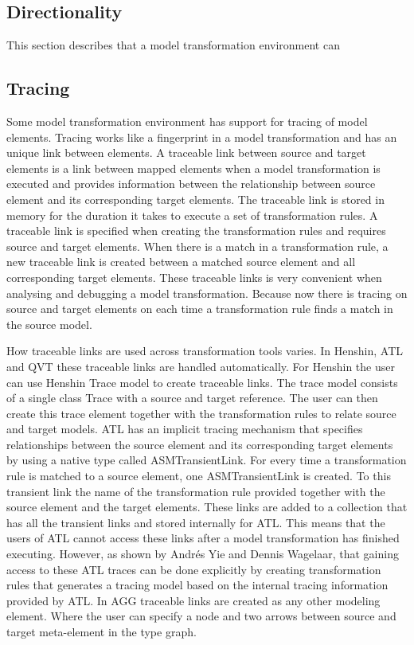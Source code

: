 \subsection{Directionality}

This section describes that a model transformation environment can 

\subsection{Tracing}

Some model transformation environment has support for tracing of model
elements. Tracing works like a fingerprint in a model transformation and
has an unique link between elements. A traceable link between source and target
elements is a link between mapped elements when a model transformation is
executed and provides information between the relationship between source
element and its corresponding target elements. The traceable link is stored in
memory for the duration it takes to execute a set of transformation rules. A
traceable link is specified when creating the transformation rules and requires
source and target elements. When there is a match in a transformation rule, a
new traceable link is created between a matched source element and all
corresponding target elements. These traceable links is very convenient when
analysing and debugging a model transformation. Because now there is tracing on
source and target elements on each time a transformation rule finds a match in
the source model.

How traceable links are used across transformation tools varies. In Henshin, ATL
and QVT these traceable links are handled automatically. For Henshin the user
can use Henshin Trace model to create traceable links. The trace model consists
of a single class Trace with a source and target reference. The user can then
create this trace element together with the transformation rules to relate
source and target models. ATL has an implicit tracing mechanism that specifies
relationships between the source element and its corresponding target elements
by using a native type called ASMTransientLink\cite{Wagelaar}. For every time a
transformation rule is matched to a source element, one ASMTransientLink is
created. To this transient link the name of the transformation rule provided
together with the source element and the target elements. These links are added
to a collection that has all the transient links and stored internally for ATL.
This means that the users of ATL cannot access these links after a model
transformation has finished executing. However, as shown by Andr\'{e}s Yie and
Dennis Wagelaar\cite{Wagelaar}, that gaining access to these ATL traces can be
done explicitly by creating transformation rules that generates a tracing
model based on the internal tracing information provided by ATL. In AGG
traceable links are created as any other modeling element. Where the user can
specify a node and two arrows between source and target meta-element in the type
graph. 

